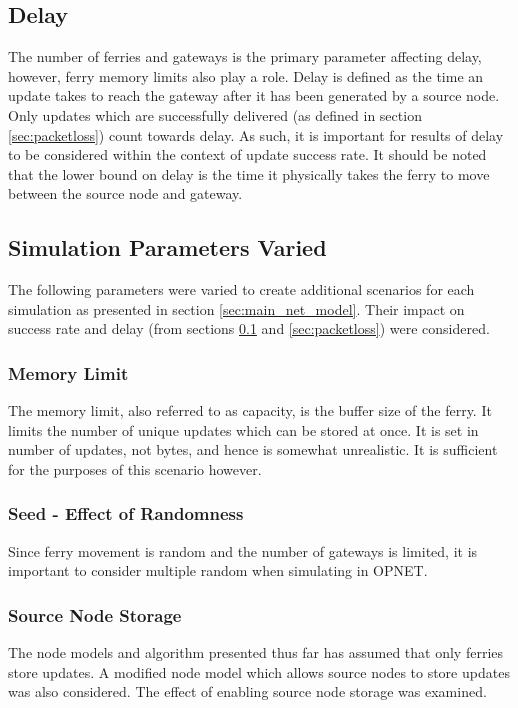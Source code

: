 \subsection{Delay}
\label{sec:delay}

The number of ferries and gateways is the primary parameter affecting delay, however, ferry memory limits also play a role.
Delay is defined as the time an update takes to reach the gateway after it has been generated by a source node.
Only updates which are successfully delivered (as defined in section \ref{sec:packetloss}) 
count towards delay.
As such, it is important for results of delay to be considered within the context of update success rate.
It should be noted that the lower bound on delay is the time it physically takes the ferry to move between the source node and gateway.

\subsection{Simulation Parameters Varied}

The following parameters were varied to create additional scenarios for each simulation as presented in section \ref{sec:main_net_model}. 
Their impact on success rate and delay (from sections \ref{sec:delay} and \ref{sec:packetloss}) were considered.
  
\subsubsection{Memory Limit}
\label{sec:mainMemLimit}
The memory limit, also referred to as capacity, is the buffer size of the ferry.
It limits the number of unique updates which can be stored at once.
It is set in number of updates, not bytes, and hence is somewhat unrealistic.
It is sufficient for the purposes of this scenario however.

\subsubsection{Seed - Effect of Randomness}
Since ferry movement is random and the number of gateways is limited, it is important to consider multiple random when simulating in OPNET. 

\subsubsection{Source Node Storage}
\label{sec:source_node_storage}
The node models and algorithm presented thus far has assumed that only ferries store updates. 
A modified node model which allows source nodes to store updates was also considered.
The effect of enabling source node storage was examined.

